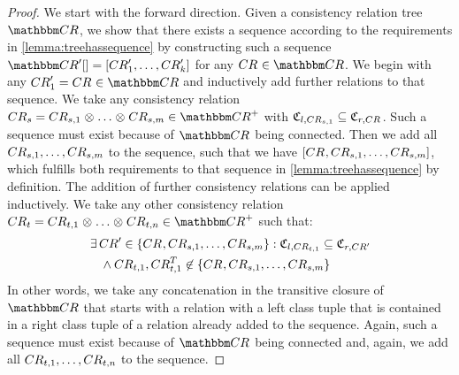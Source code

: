 \begin{proof}
    We start with the forward direction.
    Given a consistency relation tree $\consistencyrelationset{CR}$, we show that there exists a sequence according to the requirements in \autoref{lemma:treehassequence} by constructing such a sequence $\sequence{\consistencyrelationset{CR}'} = \sequenced{\consistencyrelation{CR}{1}', \dots, \consistencyrelation{CR}{k}'}$ for any $\consistencyrelation{CR}{} \in \consistencyrelationset{CR}$.
    We begin with any $\consistencyrelation{CR}{1}' = \consistencyrelation{CR}{} \in \consistencyrelationset{CR}$ and inductively add further relations to that sequence.
    We take any consistency relation $\consistencyrelation{CR}{s} = \consistencyrelation{CR}{s,1} \concat \dots \concat \consistencyrelation{CR}{s,m} \in \transitiveclosure{\consistencyrelationset{CR}}$ with $\classtuple{C}{l,\consistencyrelation{CR}{s,1}} \subseteq \classtuple{C}{r,\consistencyrelation{CR}{}}$. 
    Such a sequence must exist because of $\consistencyrelationset{CR}$ being connected.
    Then we add all $\consistencyrelation{CR}{s,1}, \dots, \consistencyrelation{CR}{s,m}$ to the sequence, such that we have $\sequenced{\consistencyrelation{CR}{}, \consistencyrelation{CR}{s,1}, \dots, \consistencyrelation{CR}{s,m}}$, which fulfills both requirements to that sequence in \autoref{lemma:treehassequence} by definition.
    The addition of further consistency relations can be applied inductively.
    We take any other consistency relation $\consistencyrelation{CR}{t} = \consistencyrelation{CR}{t,1} \concat \dots \concat \consistencyrelation{CR}{t,n} \in \transitiveclosure{\consistencyrelationset{CR}}$ such that:
    \begin{align*}
        &
        \exists \consistencyrelation{CR}{}' \in \setted{\consistencyrelation{CR}{}, \consistencyrelation{CR}{s,1}, \dots, \consistencyrelation{CR}{s,m}} :
        \classtuple{C}{l,\consistencyrelation{CR}{t,1}} \subseteq \classtuple{C}{r,\consistencyrelation{CR}{}'}\\
        & \formulaskip
        \land
        \consistencyrelation{CR}{t,1}, \consistencyrelation{CR}{t,1}^T \not\in \setted{\consistencyrelation{CR}{}, \consistencyrelation{CR}{s,1}, \dots, \consistencyrelation{CR}{s,m}}
    \end{align*}
    In other words, we take any concatenation in the transitive closure of $\consistencyrelationset{CR}$ that starts with a relation with a left class tuple that is contained in a right class tuple of a relation already added to the sequence.
    Again, such a sequence must exist because of $\consistencyrelationset{CR}$ being connected and, again, we add all $\consistencyrelation{CR}{t,1}, \dots, \consistencyrelation{CR}{t,n}$ to the sequence.

\end{proof}
